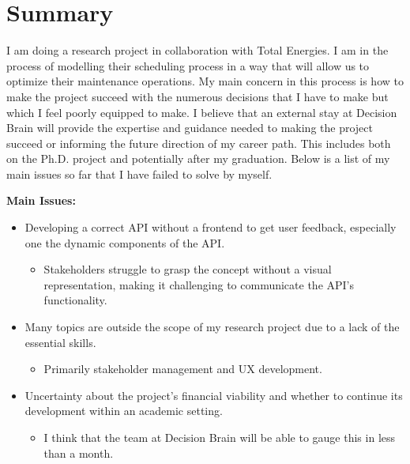 \section*{Summary}
I am doing a research project in collaboration with Total Energies. I am in the process of modelling 
their scheduling process in a way that will allow us to optimize their maintenance operations. My main concern
in this process is how to make the project succeed with the numerous decisions that I have to make but 
which I feel poorly equipped to make. I believe that an external stay at Decision Brain will provide the 
expertise and guidance needed to making the project succeed or informing the future direction of my career path. 
This includes both on the Ph.D. project and potentially after my graduation. Below is a list of my main issues so far 
that I have failed to solve by myself. 

\textbf{Main Issues:}
\begin{itemize}
	\item Developing a correct API without a frontend to get user feedback, especially one the dynamic components of the API.
	\begin{itemize}
		\item Stakeholders struggle to grasp the concept without a visual representation, making it challenging to communicate the API's functionality.
	\end{itemize}
	\item Many topics are outside the scope of my research project due to a lack of the essential skills. 
	\begin{itemize}
		\item Primarily stakeholder management and UX development.
	\end{itemize}
	\item Uncertainty about the project's financial viability and whether to continue its development within an academic setting.
	\begin{itemize}
		\item I think that the team at Decision Brain will be able to gauge this in less than a month.	
	\end{itemize}
\end{itemize}

